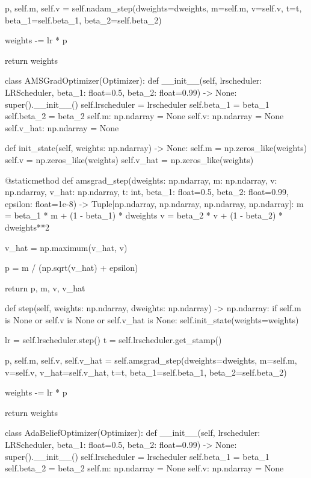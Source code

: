 \documentclass[14pt, a4paper]{article}
\theoremstyle{sltheorem}
\theoremstyle{soltheorem}
\begin{document}
\begin{python}
        p, self.m, self.v = self.nadam_step(dweights=dweights, m=self.m, v=self.v, t=t,
                                            beta_1=self.beta_1, beta_2=self.beta_2)
        
        weights -= lr * p
        
        return weights
    
    
class AMSGradOptimizer(Optimizer):
    def __init__(self, lrscheduler: LRScheduler, beta_1: float=0.5, beta_2: float=0.99) -> None:
        super().__init__()
        self.lrscheduler = lrscheduler
        self.beta_1 = beta_1
        self.beta_2 = beta_2
        self.m: np.ndarray = None
        self.v: np.ndarray = None
        self.v_hat: np.ndarray = None
        
        
    def init_state(self, weights: np.ndarray) -> None:
        self.m = np.zeros_like(weights)
        self.v = np.zeros_like(weights)
        self.v_hat = np.zeros_like(weights)
        
    @staticmethod
    def amsgrad_step(dweights: np.ndarray, m: np.ndarray, v: np.ndarray, v_hat: np.ndarray, t: int, beta_1: float=0.5, beta_2: float=0.99, epsilon: float=1e-8) -> Tuple[np.ndarray, np.ndarray, np.ndarray, np.ndarray]:
        m = beta_1 * m + (1 - beta_1) * dweights
        v = beta_2 * v + (1 - beta_2) * dweights**2

        v_hat = np.maximum(v_hat, v)

        p =  m / (np.sqrt(v_hat) + epsilon)

        return p, m, v, v_hat
    
    
    def step(self, weights: np.ndarray, dweights: np.ndarray) -> np.ndarray:
        if self.m is None or self.v is None or self.v_hat is None:
            self.init_state(weights=weights)
        
        lr = self.lrscheduler.step()
        t = self.lrscheduler.get_stamp()
        
        p, self.m, self.v, self.v_hat = self.amsgrad_step(dweights=dweights, m=self.m, v=self.v, v_hat=self.v_hat, t=t,
                                                          beta_1=self.beta_1, beta_2=self.beta_2)
        
        weights -= lr * p
        
        return weights
    
    
class AdaBeliefOptimizer(Optimizer):
    def __init__(self, lrscheduler: LRScheduler, beta_1: float=0.5, beta_2: float=0.99) -> None:
        super().__init__()
        self.lrscheduler = lrscheduler
        self.beta_1 = beta_1
        self.beta_2 = beta_2
        self.m: np.ndarray = None
        self.v: np.ndarray = None
        

\end{python}
\end{document}

